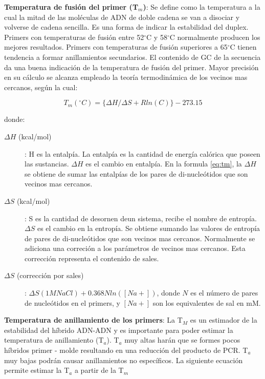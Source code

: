 \documentclass[letter,11pt]{book}
\begin{document}
\textbf{Temperatura de fusión del primer (T$_m$)}: Se define como la temperatura a la cual la mitad de las moléculas de ADN de doble cadena se van a disociar y volverse de cadena sencilla. Es una forma de indicar la estabilidad del duplex. Primers con temperaturas de fusión entre 52$^\circ$C y 58$^\circ$C normalmente producen los mejores resultados. Primers con temperaturas de fusión superiores a 65$^\circ$C tienen tendencia a formar anillamientos secundarios. El contenido de GC de la secuencia da una buena indicación de la temperatura de fusión del primer. Mayor precisión en su cálculo se alcanza empleado la teoría termodinámica de los vecinos mas cercanos, según la cual:

\begin{equation}
 T_m(^\circ C) = \lbrace\Delta H/\Delta S +Rln(C)\rbrace-273.15 \label{eq:tm}
\end{equation}

donde:

\begin{description}
\item[$\Delta H$ (kcal/mol)]: H es la entalpía. La entalpía es la cantidad de energía calórica que poseen las sustancias. $\Delta H$ es el cambio en entalpía. En la formula \ref{eq:tm}, la $\Delta H$ se obtiene de sumar las entalpías de los pares de di-nucleótidos que son vecinos mas cercanos.
\item[$\Delta S$ (kcal/mol)]: S es la cantidad de desornen deun sistema, recibe el nombre de entropía. $\Delta S$ es el cambio en la entropía. Se obtiene sumando las valores de entropía de pares de di-nucleótidos que son vecinos mas cercanos. Normalmente se adiciona una correción a los parámetros de vecinos mas cercanos. Esta corrección representa el contenido de sales.
\item[$\Delta S$ (corrección por sales)]: $ \Delta S (1M NaCl )+ 0.368  N  ln([Na+]) $, donde $N$ es el número de pares de nucleótidos en el primers, y $[Na+]$ son los equivalentes de sal en mM.
\end{description}

\textbf{Temperatura de anillamiento de los primers}: La T$_M$ es un estimador de la estabilidad del híbrido ADN-ADN y es importante para poder estimar la temperatura de anillamiento (T$_a$).  T$_a$ muy altas harán que se formes pocos híbridos primer - molde resultando en una reducción del producto de PCR.  T$_a$ muy bajas podrán causar anillamientos no específicos. La siguiente ecuación permite estimar la T$_a$ a partir de la T$_m$
\end{document}
